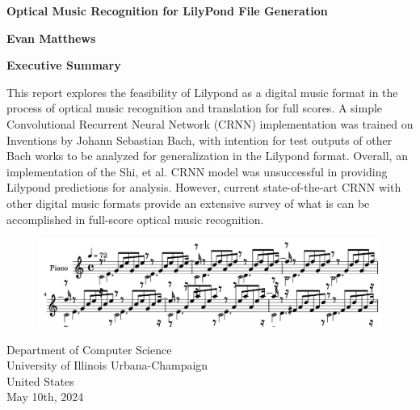 \documentclass[nonacm, sigconf]{acmart}
\begin{document}
\begin{titlepage}
    \begin{center}
        \vspace*{1cm}
            
        \Huge
        \textbf{Optical Music Recognition for LilyPond File Generation}
            
        \vspace{0.5cm}
        \LARGE
            
        \vspace{0.5cm}
            
        \textbf{Evan Matthews}

        \vspace{0.9cm}
		\textbf{Executive Summary}

		\vspace{0.5cm}
		This report explores the feasibility of Lilypond as a digital music format in the process of optical music recognition and translation for full scores.
		A simple Convolutional Recurrent Neural Network (CRNN) implementation was trained on Inventions by Johann Sebastian Bach, with intention for test outputs of other Bach works to be analyzed for generalization in the Lilypond format.
		Overall, an implementation of the Shi, et al. CRNN model was unsuccessful in providing Lilypond predictions for analysis. 
		However, current state-of-the-art CRNN with other digital music formats provide an extensive survey of what is can be accomplished in full-score optical music recognition.

		\begin{figure}
			\centering
			\includegraphics[width = .8\linewidth]{./figures/cover.png}
		\end{figure}

        \vfill
            
        \vspace{0.8cm}
            
        \Large
        Department of Computer Science\\
        University of Illinois Urbana-Champaign\\
        United States\\
        May 10th, 2024
            
    \end{center}
\end{titlepage}
\end{document}
